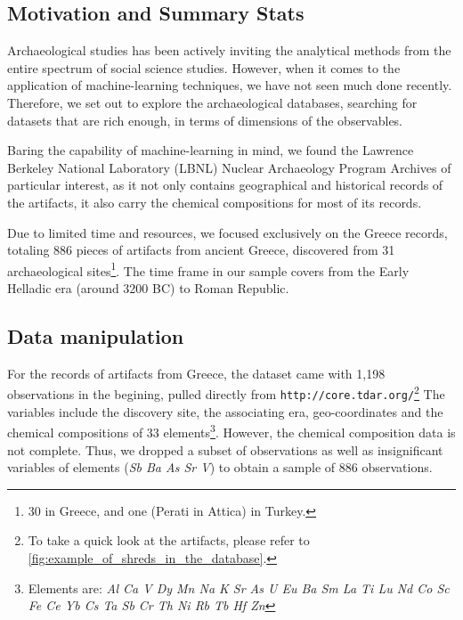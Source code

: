 \subsection{Motivation and Summary Stats}
Archaeological studies has been actively inviting the analytical methods from
the entire spectrum of social science studies. However, when it comes to the
application of machine-learning techniques, we have not seen much done recently.
Therefore, we set out to explore the archaeological databases, searching for
datasets that are rich enough, in terms of dimensions of the observables.

Baring the capability of machine-learning in mind, we found the 
Lawrence Berkeley National Laboratory (LBNL) Nuclear Archaeology Program
Archives %
of particular interest, as it not only contains geographical and historical
records of the artifacts, it also carry the chemical compositions for most of
its records.


Due to limited time and resources, we focused exclusively on the Greece records,
totaling 886 pieces of artifacts from ancient Greece, discovered from 31
archaeological sites\footnote{30 in Greece, and one (Perati in Attica) in
Turkey.}.  The time frame in our sample covers from the Early Helladic era
(around 3200 BC) to Roman Republic. 

\subsection{Data manipulation}
For the records of artifacts from Greece, the dataset came with 1,198
observations in the begining, pulled directly from
\verb|http://core.tdar.org/|\footnote{To take a quick look at the artifacts,
please refer to \ref{fig:example_of_shreds_in_the_database}.}
The variables include the discovery site, the associating era, geo-coordinates
and the chemical compositions of 33 elements\footnote{Elements are:
    \textit{Al Ca V Dy Mn Na K Sr As U Eu Ba Sm La Ti Lu Nd Co Sc Fe Ce Yb Cs Ta
    Sb Cr Th Ni Rb Tb Hf Zn}
}. However, the chemical composition
data is not complete. Thus, we dropped a subset of observations as well as
insignificant variables of elements (\textit{Sb Ba As Sr V}) to obtain a sample
of 886 observations. 
